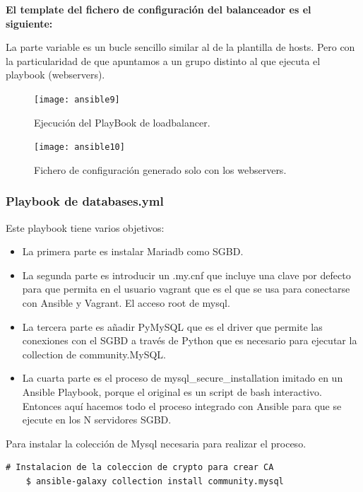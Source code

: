 \textbf{El template del fichero de configuración del balanceador es el siguiente:}
\vspace{5mm}

\vspace{5mm}

La parte variable es un bucle sencillo similar al de la plantilla de hosts. Pero con la particularidad de que apuntamos a un grupo distinto al que ejecuta el playbook (webservers).

\begin{figure}[H]
	\centering
	\texttt{[image: ansible9]}
	\caption{Ejecución del PlayBook de loadbalancer.}
\end{figure}

\begin{figure}[H]
	\centering
	\texttt{[image: ansible10]}
	\caption{Fichero de configuración generado solo con los webservers.}
\end{figure}

\newpage
\subsubsection{Playbook de databases.yml}

Este playbook tiene varios objetivos:

\begin{itemize}
	\item La primera parte es instalar Mariadb como SGBD.
	\item La segunda parte es introducir un .my.cnf que incluye una clave por defecto para que permita en el usuario vagrant que es el que se usa para conectarse con Ansible y Vagrant. El acceso root de mysql.
	\item La tercera parte es añadir PyMySQL que es el driver que permite las conexiones con el SGBD a través de Python que es necesario para ejecutar la collection de community.MySQL.
	\item La cuarta parte es el proceso de mysql\_secure\_installation imitado en un Ansible Playbook, porque el original es un script de bash interactivo. Entonces aquí hacemos todo el proceso integrado con Ansible para que se ejecute en los N servidores SGBD.
\end{itemize}

Para instalar la colección de Mysql necesaria para realizar el proceso.

\begin{lstlisting}[style=mybash]
	# Instalacion de la coleccion de crypto para crear CA
	$ ansible-galaxy collection install community.mysql
\end{lstlisting}

